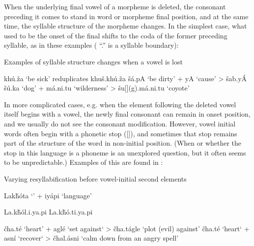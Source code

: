 \documentclass[output=paper]{LSP/langsci}
\begin{document}
When the underlying final vowel of a morpheme is deleted, the consonant preceding it comes to stand in word or morpheme final position, and at the same time, the syllable structure of the morpheme changes. In the simplest case, what used to be the onset of the final shifts to the coda of the former preceding syllable, as in these examples ( ``.'' is a syllable boundary):

\begin{exe}\label{ex:rood:12}
\ex Examples of syllable structure changes when a vowel is lost
\begin{xlist}
\ex kh\'u.\v{z}a `be sick' reduplicates khu\v{s}.kh\'u.\v{z}a
\ex \v{s}\'a.pA `be dirty' + yA `cause' > \v{s}ab.y\'A
\ex \v{s}\'u.ka `dog' + m\'a.ni.tu `wilderness' > \v{s}u[](g).m\'a.ni.tu `coyote'
\end{xlist}
\end{exe}

In more complicated cases, e.g. when the element following the deleted vowel itself begins with a vowel, the newly final consonant can remain in onset position, and we usually do not see the consonant modification. However, vowel initial words often begin with a phonetic  stop ([]), and sometimes that  stop remains part of the structure of the word in non-initial position. (When or whether the  stop in this language is a phoneme is an unexplored question, but it often seems to be unpredictable.) Examples of this are found in :

\begin{exe}\label{ex:rood:13}
\ex Varying resyllabification before vowel-initial second elements
\begin{xlist}
\ex Lak\v{h}\'ota `' + iy\'api `language'
\begin{xlist}
\ex La.k\v{h}\'ol.i.ya.pi
\ex La.k\v{h}\'o.ti.ya.pi
\end{xlist}
\ex 
\begin{xlist}
\ex \v{c}ha.t\'e `heart' + agl\'e `set against` > \v{c}ha.t\'agle `plot (evil) against'
\ex \v{c}ha.t\'e `heart` + asn\'i `recover` > \v{c}hal.\'asni `calm down from an angry spell'
\end{xlist}
\end{xlist}
\end{exe}
\end{document}

